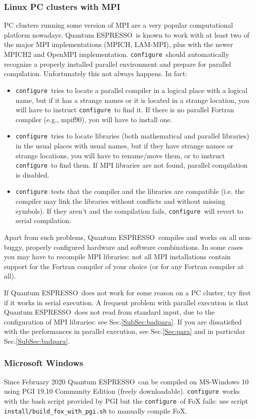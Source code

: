 \documentclass[12pt,a4paper]{article}
\def\qe{{\sc Quantum ESPRESSO}}
\def\configure{\texttt{configure}}
\begin{document}
\subsubsection{Linux PC clusters with MPI}
\label{SubSec:LinuxPCMPI}
PC clusters running some version of MPI are a very popular
computational platform nowadays. \qe\ is known to work
with at least two of the major MPI implementations (MPICH, LAM-MPI),
plus with the newer MPICH2 and OpenMPI implementation.
\configure\ should automatically recognize a properly installed
parallel environment and prepare for parallel compilation.
Unfortunately this not always happens. In fact:
\begin{itemize}
\item \configure\ tries to locate a parallel compiler in a logical
  place with a logical name, but if it has a strange names or it is
  located  in a strange location, you will have to instruct \configure\
  to find it. If there is no parallel Fortran compiler (e.g., mpif90),
  you will have to install one.
\item \configure\ tries to locate libraries (both mathematical and
  parallel libraries) in the usual places with usual names, but if
  they have strange names or strange locations, you will have to
  rename/move them, or to instruct \configure\ to find them. If MPI
  libraries are not found, parallel compilation is disabled.
\item \configure\ tests that the compiler and the libraries are
  compatible (i.e. the compiler may link the libraries without
  conflicts and without missing symbols). If they aren't and the
  compilation fails, \configure\ will revert to serial compilation.
\end{itemize}

Apart from such problems, \qe\ compiles and works on all non-buggy, properly
configured hardware and software combinations. In some cases you may have to
recompile MPI libraries: not all MPI installations contain support for
the Fortran compiler of your choice (or for any Fortran compiler
at all).

If \qe\ does not work for some reason on a PC cluster,
try first if it works in serial execution. A frequent problem with parallel
execution is that \qe\ does not read from standard input,
due to the configuration of MPI libraries: see Sec.\ref{SubSec:badpara}.
If you are dissatisfied with the performances in parallel execution,
see Sec.\ref{Sec:para} and in particular Sec.\ref{SubSec:badpara}.

\subsubsection{Microsoft Windows}
\label{SubSec:Windows}
Since February 2020 \qe\ can be compiled on MS-Windows 10 using PGI 19.10
Community Edition (freely downloadable). \configure\ works with the bash
script provided by PGI but the \configure\ of FoX fails: use script
\texttt{install/build\_fox\_with\_pgi.sh} to manually compile FoX.
\end{document}
